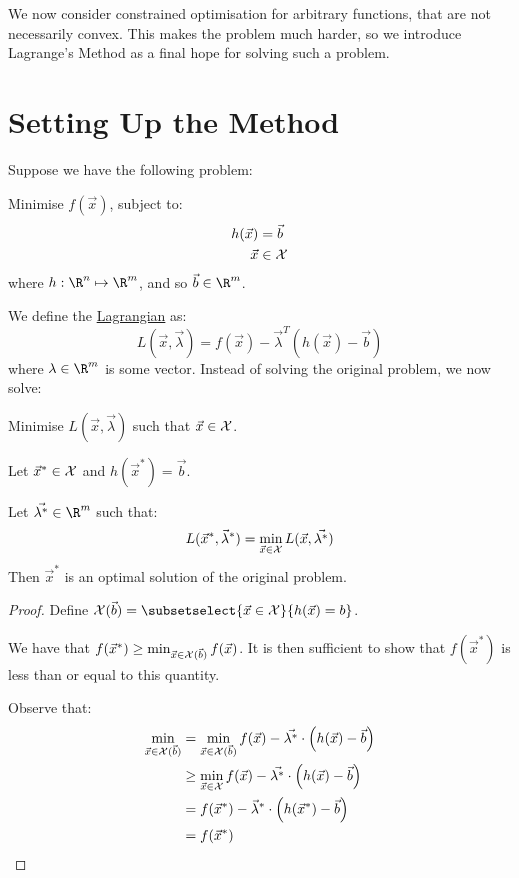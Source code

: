 \documentclass[../Main.tex]{subfiles}
\begin{document}
We now consider constrained optimisation for arbitrary functions, that are not necessarily convex. This makes the problem much harder, so we introduce Lagrange's Method as a final hope for solving such a problem.
\section{Setting Up the Method}
Suppose we have the following problem:

Minimise $f(\vec{x})$, subject to:
\begin{align*}
    h(\vec{x}) &= \vec{b} \\
    \vec{x} &\in \mathcal{X}
\end{align*}
where $h : \R^n \mapsto \R^m$, and so $\vec{b} \in \R^m$.

We define the \underline{Lagrangian} as:
\begin{equation*}
    L(\vec{x}, \vec{\lambda}) = f(\vec{x}) - \vec{\lambda}^T (h(\vec{x}) - \vec{b})
\end{equation*}
where $\lambda \in \R^m$ is some vector. Instead of solving the original problem, we now solve:

Minimise $L(\vec{x}, \vec{\lambda})$ such that $\vec{x} \in \mathcal{X}$.
\begin{theorem}
    Let $\vec{x}^* \in \mathcal{X}$ and $h(\vec{x}^*) = \vec{b}$.

    Let $\vec{\lambda^*} \in \R^m$ such that:
    \begin{equation*}
        L(\vec{x}^*, \vec{\lambda}^*) = \min_{\vec{x} \in \mathcal{X}} L(\vec{x}, \vec{\lambda^*})
    \end{equation*}
    Then $\vec{x}^*$ is an optimal solution of the original problem.
\end{theorem}
\begin{proof}
    Define $\Xset(\vec{b}) = \subsetselect{\vec{x} \in \Xset}{h(\vec{x}) = b}$.

    We have that $f(\vec{x}^*) \geq \min_{\vec{x} \in \mathcal{X}(\vec{b})} f(\vec{x})$. It is then sufficient to show that $f(\vec{x}^*)$ is less than or equal to this quantity.

    Observe that:
    \begin{align*}
        \min_{\vec{x} \in \mathcal{X}(\vec{b})} &= \min_{\vec{x} \in \mathcal{X}(\vec{b})} f(\vec{x}) - \vec{\lambda^*} \cdot \left(h(\vec{x}) - \vec{b}\right) \\
        &\geq \min_{\vec{x} \in \mathcal{X}} f(\vec{x}) - \vec{\lambda^*} \cdot \left(h(\vec{x}) - \vec{b}\right) \\
        &= f(\vec{x}^*) - \vec{\lambda}^* \cdot \left(h(\vec{x}^*) - \vec{b}\right) \\
        &= f(\vec{x}^*)
    \end{align*}
\end{proof}
\end{document}
